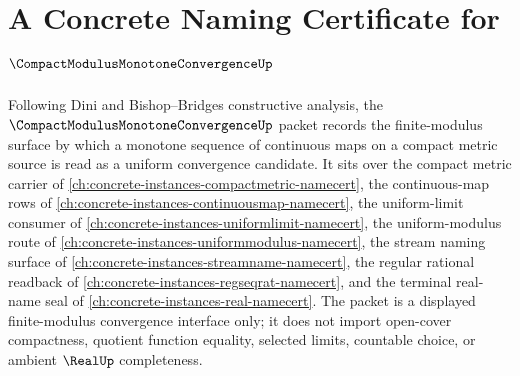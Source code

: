 \chapter{A Concrete Naming Certificate for $\CompactModulusMonotoneConvergenceUp$}
\label{ch:concrete-instances-compact-modulus-monotone-convergence-namecert}

Following Dini and Bishop--Bridges constructive analysis, the $\CompactModulusMonotoneConvergenceUp$ packet records the finite-modulus surface by which a monotone sequence of continuous maps on a compact metric source is read as a uniform convergence candidate. It sits over the compact metric carrier of \autoref{ch:concrete-instances-compactmetric-namecert}, the continuous-map rows of \autoref{ch:concrete-instances-continuousmap-namecert}, the uniform-limit consumer of \autoref{ch:concrete-instances-uniformlimit-namecert}, the uniform-modulus route of \autoref{ch:concrete-instances-uniformmodulus-namecert}, the stream naming surface of \autoref{ch:concrete-instances-streamname-namecert}, the regular rational readback of \autoref{ch:concrete-instances-regseqrat-namecert}, and the terminal real-name seal of \autoref{ch:concrete-instances-real-namecert}. The packet is a displayed finite-modulus convergence interface only; it does not import open-cover compactness, quotient function equality, selected limits, countable choice, or ambient $\RealUp$ completeness.



